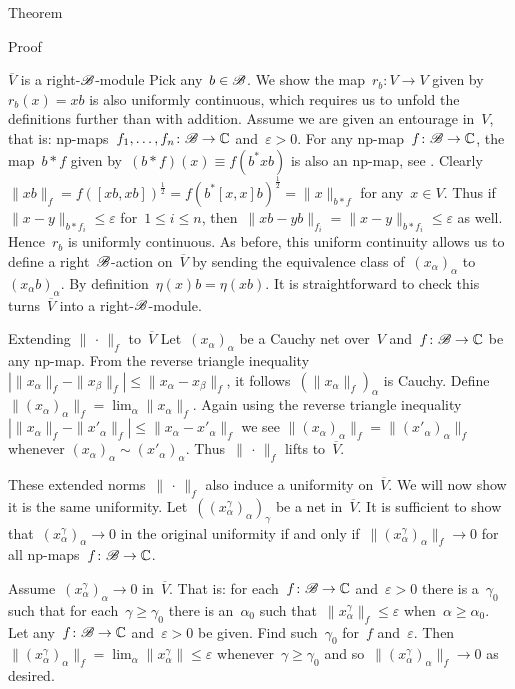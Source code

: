 \documentclass[b]{subfiles}
\begin{document}
\begin{parsec}
\begin{point}{Theorem}
\begin{point}{Proof}
\begin{point}{$\overline{V}$ is a right-$\mathscr{B}$-module}
Pick any~$b \in \mathscr{B}$. We show the map~$r_b\colon V \to V$
given by~$r_b(x) = xb$ is also uniformly continuous,
which requires us to unfold the definitions further
than with addition.
Assume we are given an entourage in~$V$,
that is: np-maps~$f_1,\ldots,f_n\colon \mathscr{B} \to \mathbb{C}$
and~$\varepsilon > 0$.
For any np-map~$f\colon \mathscr{B} \to \mathbb{C}$,
    the map~$b*f$ given by~$(b * f)(x) \equiv f(b^* x b)$ is also an np-map,
    see .
    Clearly~$\|xb\|_f = f([xb,xb])^{\frac{1}{2}}
    = f(b^* [x,x] b)^{\frac{1}{2}} = \|x\|_{b*f}$
    for any~$x \in V$.
Thus if~$\|x-y\|_{b*f_i} \leq \varepsilon$ for~$1 \leq i \leq n$,
then~$\|xb-yb\|_{f_i} = \|x-y\|_{b*f_i} \leq \varepsilon$
as well. Hence~$r_b$ is uniformly continuous.
As before, this uniform continuity
allows us to define a right~$\mathscr{B}$-action on~$\overline{V}$
by sending the equivalence class of~$(x_\alpha)_\alpha$
to~$(x_\alpha b)_\alpha$. By definition~$\eta(x)b = \eta(xb)$.
It is straightforward to check this turns~$\overline{V}$
into a right-$\mathscr{B}$-module.
\end{point}
\begin{point}{Extending $\|\,\cdot\,\|_f$ to~$\overline{V}$}%
Let~$(x_\alpha)_\alpha$ be a Cauchy net over~$V$
    and~$f\colon \mathscr{B} \to \mathbb{C}$ be any np-map.
From the reverse triangle inequality~$| \|x_\alpha \|_f - \|x_\beta\|_f |
        \leq \|x_\alpha - x_\beta \|_f$,
        it follows~$(\| x_\alpha \|_f)_\alpha$ is Cauchy.
Define~$\|(x_\alpha)_\alpha\|_f = \lim_\alpha \|x_\alpha\|_f$.
Again using the reverse triangle
    inequality~$| \|x_\alpha \|_f - \|x'_\alpha\|_f |
        \leq \|x_\alpha - x'_\alpha \|_f$
        we see $\|(x_\alpha)_\alpha\|_f =
        \|(x'_\alpha)_\alpha\|_f$
        whenever $(x_\alpha)_\alpha \sim (x'_\alpha)_\alpha$.
Thus~$\|\,\cdot\,\|_f$ lifts to~$\overline{V}$.

These extended norms~$\|\,\cdot\,\|_f$ also induce a uniformity
    on~$\overline{V}$.  We will now show it is the same uniformity.
    Let~$((x_\alpha^\gamma)_\alpha)_\gamma$ be a net in~$\overline{V}$.
    It is sufficient to show that~$(x_\alpha^\gamma)_\alpha \to 0$
    in the original uniformity
    if and only if~$\|(x_\alpha^\gamma)_\alpha\|_f \to 0$
        for all np-maps~$f\colon \mathscr{B} \to \mathbb{C}$.

Assume~$(x^\gamma_\alpha)_\alpha \to 0$ in~$\overline{V}$.
That is: for each~$f\colon \mathscr{B} \to \mathbb{C}$ and~$\varepsilon > 0$
    there is a~$\gamma_0$
    such that for each~$\gamma \geq \gamma_0$
    there is an~$\alpha_0$
    such that~$\|x^\gamma_\alpha\|_f \leq \varepsilon$
    when~$\alpha \geq \alpha_0$.
Let any~$f\colon \mathscr{B} \to \mathbb{C}$ and~$\varepsilon > 0$ be given.
Find such~$\gamma_0$ for~$f$ and~$\varepsilon$.
Then~$\|(x^\gamma_\alpha)_\alpha \|_f
    = \lim_\alpha \|x^\gamma_\alpha\| \leq \varepsilon$
    whenever~$\gamma \geq \gamma_0$
    and so~$\|(x^\gamma_\alpha)_\alpha\|_f \to 0$ as desired.


\end{point}
\end{point}
\end{point}
\end{parsec}
\end{document}
